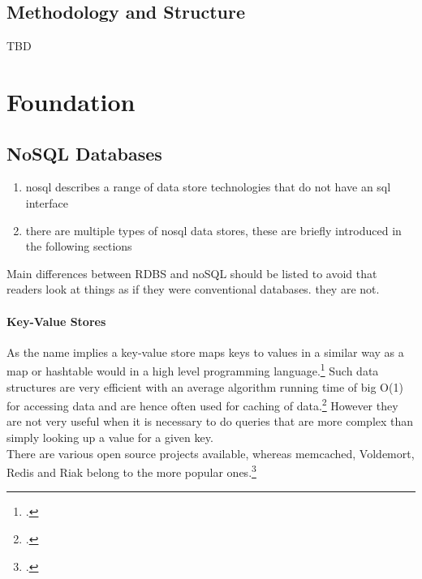 \subsection{Methodology and Structure}
\label{sec:methodology}

TBD


\newpage

\section{Foundation}
\label{sec:foundation}



\subsection{NoSQL Databases}
\label{sec:nosql}

\begin{enumerate}
  \item nosql describes a range of data store technologies that do not have an sql interface
  \item there are multiple types of nosql data stores, these are briefly introduced in the following sections
\end{enumerate}
Main differences between RDBS and noSQL should be listed to avoid that readers
look at things as if they were conventional databases. they are not.

\paragraph{Key-Value Stores}
\label{sec:nosql-key-value}
As the name implies a key-value store maps keys to values in a similar way as a
map or hashtable would in a high level programming
language.\footcite[Cf.][4]{Redmond_2012} Such data structures are very efficient
with an average algorithm running time of big O(1) for accessing data and
are hence often used for caching of data.\footcite[Cf.][p. 14 et sq.]{Tiwari_2011}
However they are not very useful when it is necessary to do queries that are
more complex than simply looking up a value for a given key.\\
There are various open source projects available, whereas memcached, Voldemort,
Redis and Riak belong to the more popular ones.\footcite[Cf.][4]{Redmond_2012}

